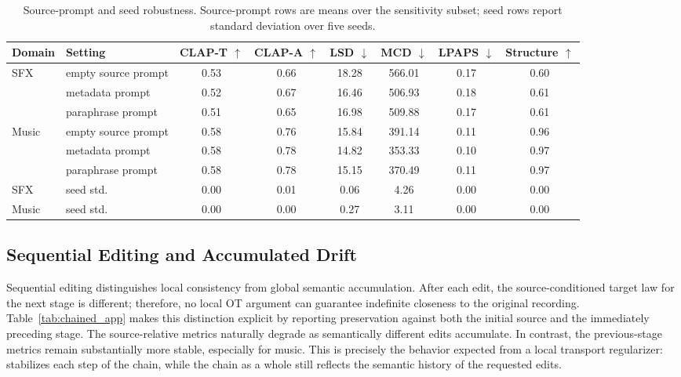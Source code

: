 \begin{table}[htpb]
    \centering
    \small
    \setlength{\tabcolsep}{4.5pt}
    \begin{tabular}{llcccccc}
        \toprule
        \textbf{Domain} & \textbf{Setting} & \textbf{CLAP-T} $\uparrow$ & \textbf{CLAP-A} $\uparrow$ & \textbf{LSD} $\downarrow$ & \textbf{MCD} $\downarrow$ & \textbf{LPAPS} $\downarrow$ & \textbf{Structure} $\uparrow$ \\
        \midrule
        \multirow{3}{*}{SFX} & empty source prompt & 0.53 & 0.66 & 18.28 & 566.01 & 0.17 & 0.60 \\
        & metadata prompt & 0.52 & 0.67 & 16.46 & 506.93 & 0.18 & 0.61 \\
        & paraphrase prompt & 0.51 & 0.65 & 16.98 & 509.88 & 0.17 & 0.61 \\
        \cmidrule(lr){1-8}
        \multirow{3}{*}{Music} & empty source prompt & 0.58 & 0.76 & 15.84 & 391.14 & 0.11 & 0.96 \\
        & metadata prompt & 0.58 & 0.78 & 14.82 & 353.33 & 0.10 & 0.97 \\
        & paraphrase prompt & 0.58 & 0.78 & 15.15 & 370.49 & 0.11 & 0.97 \\
        \midrule
        SFX & seed std. & 0.00 & 0.01 & 0.06 & 4.26 & 0.00 & 0.00 \\
        Music & seed std. & 0.00 & 0.00 & 0.27 & 3.11 & 0.00 & 0.00 \\
        \bottomrule
    \end{tabular}
    \caption{Source-prompt and seed robustness. Source-prompt rows are means over the sensitivity subset; seed rows report standard deviation over five seeds.}
    \label{tab:robust_app}
\end{table}

\subsection{Sequential Editing and Accumulated Drift}
\label{app:chained_editing}

Sequential editing distinguishes local consistency from global semantic accumulation.
After each edit, the source-conditioned target law for the next stage is different; therefore, no local OT argument can guarantee indefinite closeness to the original recording.
Table~\ref{tab:chained_app} makes this distinction explicit by reporting preservation against both the initial source and the immediately preceding stage.
The source-relative metrics naturally degrade as semantically different edits accumulate.
In contrast, the previous-stage metrics remain substantially more stable, especially for music.
This is precisely the behavior expected from a local transport regularizer: \methodplus stabilizes each step of the chain, while the chain as a whole still reflects the semantic history of the requested edits.

